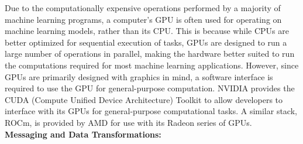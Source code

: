 \documentclass[titlepage, draft]{article}
\begin{document}
Due to the computationally expensive operations performed by a majority of machine learning programs, a computer's GPU is often
used for operating on machine learning models, rather than its CPU.
This is because while CPUs are better optimized for sequential execution of tasks, GPUs are designed to run a large number of
operations in parallel, making the hardware better suited to run the computations required for most machine learning applications.
However, since GPUs are primarily designed with graphics in mind, a software interface is required to use the GPU for
general-purpose computation.
NVIDIA provides the CUDA (Compute Unified Device Architecture) Toolkit \cite{CUDA} to allow developers to interface with its
GPUs for general-purpose computational tasks.
A similar stack, ROCm, is provided by AMD for use with its Radeon series of GPUs. \cite{ROCm}
\\

\textbf{Messaging and Data Transformations:}
\end{document}
